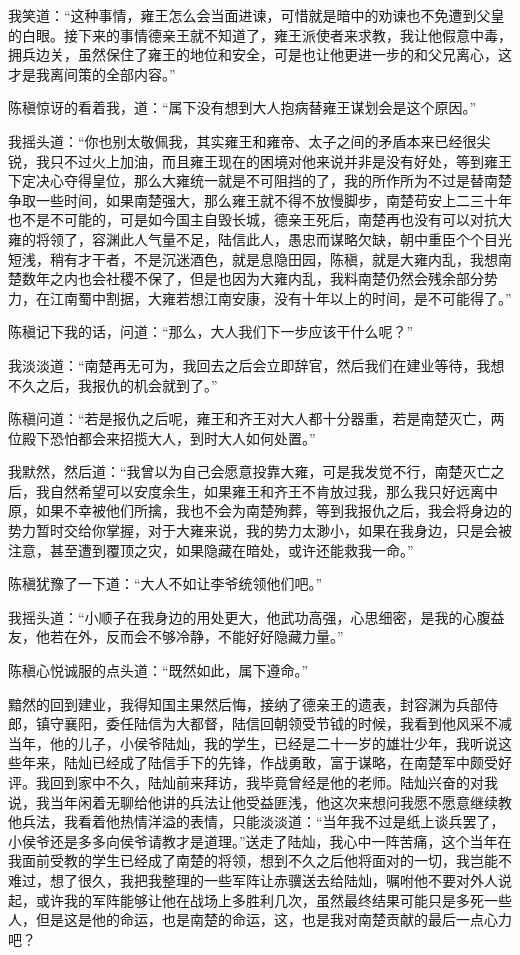 我笑道：“这种事情，雍王怎么会当面进谏，可惜就是暗中的劝谏也不免遭到父皇的白眼。接下来的事情德亲王就不知道了，雍王派使者来求教，我让他假意中毒，拥兵边关，虽然保住了雍王的地位和安全，可是也让他更进一步的和父兄离心，这才是我离间策的全部内容。”

陈稹惊讶的看着我，道：“属下没有想到大人抱病替雍王谋划会是这个原因。”

我摇头道：“你也别太敬佩我，其实雍王和雍帝、太子之间的矛盾本来已经很尖锐，我只不过火上加油，而且雍王现在的困境对他来说并非是没有好处，等到雍王下定决心夺得皇位，那么大雍统一就是不可阻挡的了，我的所作所为不过是替南楚争取一些时间，如果南楚强大，那么雍王就不得不放慢脚步，南楚苟安上二三十年也不是不可能的，可是如今国主自毁长城，德亲王死后，南楚再也没有可以对抗大雍的将领了，容渊此人气量不足，陆信此人，愚忠而谋略欠缺，朝中重臣个个目光短浅，稍有才干者，不是沉迷酒色，就是息隐田园，陈稹，就是大雍内乱，我想南楚数年之内也会社稷不保了，但是也因为大雍内乱，我料南楚仍然会残余部分势力，在江南蜀中割据，大雍若想江南安康，没有十年以上的时间，是不可能得了。”

陈稹记下我的话，问道：“那么，大人我们下一步应该干什么呢？”

我淡淡道：“南楚再无可为，我回去之后会立即辞官，然后我们在建业等待，我想不久之后，我报仇的机会就到了。”

陈稹问道：“若是报仇之后呢，雍王和齐王对大人都十分器重，若是南楚灭亡，两位殿下恐怕都会来招揽大人，到时大人如何处置。”

我默然，然后道：“我曾以为自己会愿意投靠大雍，可是我发觉不行，南楚灭亡之后，我自然希望可以安度余生，如果雍王和齐王不肯放过我，那么我只好远离中原，如果不幸被他们所擒，我也不会为南楚殉葬，等到我报仇之后，我会将身边的势力暂时交给你掌握，对于大雍来说，我的势力太渺小，如果在我身边，只是会被注意，甚至遭到覆顶之灾，如果隐藏在暗处，或许还能救我一命。”

陈稹犹豫了一下道：“大人不如让李爷统领他们吧。”

我摇头道：“小顺子在我身边的用处更大，他武功高强，心思细密，是我的心腹益友，他若在外，反而会不够冷静，不能好好隐藏力量。”

陈稹心悦诚服的点头道：“既然如此，属下遵命。”

黯然的回到建业，我得知国主果然后悔，接纳了德亲王的遗表，封容渊为兵部侍郎，镇守襄阳，委任陆信为大都督，陆信回朝领受节钺的时候，我看到他风采不减当年，他的儿子，小侯爷陆灿，我的学生，已经是二十一岁的雄壮少年，我听说这些年来，陆灿已经成了陆信手下的先锋，作战勇敢，富于谋略，在南楚军中颇受好评。我回到家中不久，陆灿前来拜访，我毕竟曾经是他的老师。陆灿兴奋的对我说，我当年闲着无聊给他讲的兵法让他受益匪浅，他这次来想问我愿不愿意继续教他兵法，我看着他热情洋溢的表情，只能淡淡道：“当年我不过是纸上谈兵罢了，小侯爷还是多多向侯爷请教才是道理。”送走了陆灿，我心中一阵苦痛，这个当年在我面前受教的学生已经成了南楚的将领，想到不久之后他将面对的一切，我岂能不难过，想了很久，我把我整理的一些军阵让赤骥送去给陆灿，嘱咐他不要对外人说起，或许我的军阵能够让他在战场上多胜利几次，虽然最终结果可能只是多死一些人，但是这是他的命运，也是南楚的命运，这，也是我对南楚贡献的最后一点心力吧？

